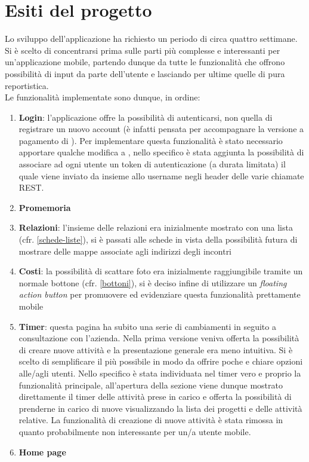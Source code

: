 \section{Esiti del progetto}\label{esiti}

Lo sviluppo dell'applicazione ha richiesto un periodo di circa quattro settimane.
Si è scelto di concentrarsi prima sulle parti più complesse e interessanti per
un'applicazione mobile, partendo dunque da tutte le funzionalità che offrono possibilità
di input da parte dell'utente e lasciando per ultime quelle di pura reportistica. \\

Le funzionalità implementate sono dunque, in ordine:

\begin{enumerate}
\item \textbf{Login}: l'applicazione offre la possibilità di autenticarsi, non quella
di registrare un nuovo account (è infatti pensata per accompagnare la versione a
pagamento di \fiscoloWeb). Per implementare questa funzionalità è stato necessario
apportare qualche modifica a \fiscoloWeb{}, nello specifico è stata aggiunta la possibilità
di associare ad ogni utente un token di autenticazione (a durata limitata) il quale viene
inviato da \fiscoloMobile{} insieme allo username negli header delle varie chiamate REST.
\item \textbf{Promemoria}
\item \textbf{Relazioni}: l'insieme delle relazioni era inizialmente mostrato con una
lista (cfr. \ref{schede-liste}), si è passati alle schede in vista della possibilità
futura di mostrare delle mappe associate agli indirizzi degli incontri
\item \textbf{Costi}: la possibilità di scattare foto era inizialmente raggiungibile tramite
un normale bottone (cfr. \ref{bottoni}), si è deciso infine di utilizzare un
\textit{floating action button} per promuovere ed evidenziare questa funzionalità
prettamente mobile
\item \textbf{Timer}: questa pagina ha subito una serie di cambiamenti in seguito a
consultazione con l'azienda. Nella prima versione veniva offerta la possibilità di creare
nuove attività e la presentazione generale era meno intuitiva. Si è scelto di semplificare
il più possibile in modo da offrire poche e chiare opzioni alle/agli utenti. Nello specifico
è stata individuata nel timer vero e proprio la funzionalità principale, all'apertura della
sezione viene dunque mostrato direttamente il timer delle attività prese in carico e offerta
la possibilità di prenderne in carico di nuove visualizzando la lista dei progetti e delle
attività relative. La funzionalità di creazione di nuove attività è stata rimossa in quanto
probabilmente non interessante per un/a utente mobile.
\item \textbf{Home page}
\end{enumerate}

